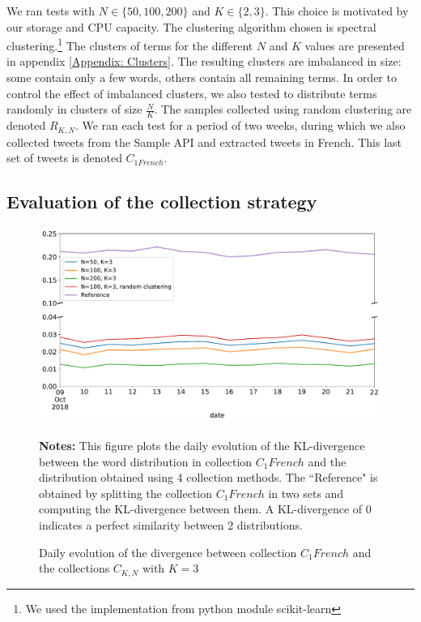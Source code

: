  We ran tests with $N \in \{50, 100, 200\}$ and $K \in \{2,3\}$. This choice is motivated by our storage and CPU capacity. The clustering algorithm chosen is spectral clustering.\footnote{We used the implementation from python module scikit-learn} The clusters of terms for the different $N$ and $K$ values are presented in appendix \ref{Appendix: Clusters}. The resulting clusters are imbalanced in size: some contain only a few words, others contain all remaining terms. In order to control the effect of imbalanced clusters, we also tested to distribute terms randomly in clusters of size $\frac{N}{K}$. The samples collected using random clustering are denoted $R_{K,N}$. We ran each test for a period of two weeks, during which we also collected tweets from the Sample API and extracted tweets in French. This last set of tweets is denoted $C_{1 French}$.
			
			\subsection{Evaluation of the collection strategy \label{SubSec: evaluation_of_collection}}
			
\begin{figure}
\begin{center}
\includegraphics[scale=.5]{figures/KL_K=3.pdf}
\end{center}
{\scriptsize \textbf{Notes:} This figure plots the daily evolution of the KL-divergence between the word distribution in collection $C_1 French$ and the distribution obtained using 4 collection methods. The ``Reference" is obtained by splitting the collection $C_1 French$ in two sets and computing the KL-divergence between them. A KL-divergence of 0 indicates a perfect similarity between 2 distributions.}
\caption{Daily evolution of the divergence between collection $C_1 French$ and the collections $C_{K,N}$ with $K = 3$}
\label{Figure:KL_K=3}
\end{figure}

